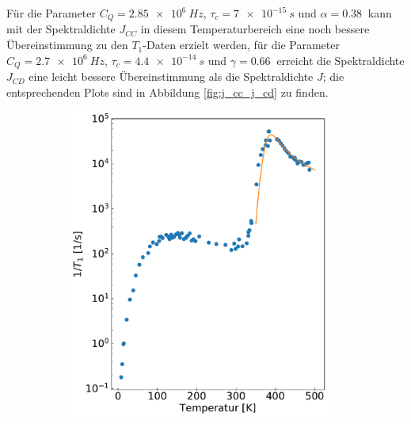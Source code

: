 Für die Parameter $C_Q = \SI{2.85e6}{Hz}$, $\tau_c = \SI{7e-15}{s}$ und $\alpha = \SI{0.38}{}$ kann mit der Spektraldichte $J_{CC}$ in diesem Temperaturbereich eine noch bessere Übereinstimmung zu den $T_1$-Daten erzielt werden, für die Parameter $C_Q = \SI{2.7e6}{Hz}$, $\tau_c = \SI{4.4e-14}{s}$ und $\gamma = \SI{0.66}{}$ erreicht die Spektraldichte $J_{CD}$ eine leicht bessere Übereinstimmung als die Spektraldichte $J$; die entsprechenden Plots sind in Abbildung \ref{fig:j_cc_j_cd} zu finden.
\begin{figure}[H]
	\centering
	\begin{subfigure}{0.49\textwidth}
		\centering
		\includegraphics[width=0.95\textwidth]{graphics/zwischenbericht/J_cc.pdf}
	\end{subfigure}%
	\begin{subfigure}{0.49\textwidth}
		\centering

\end{subfigure}
\end{figure}
